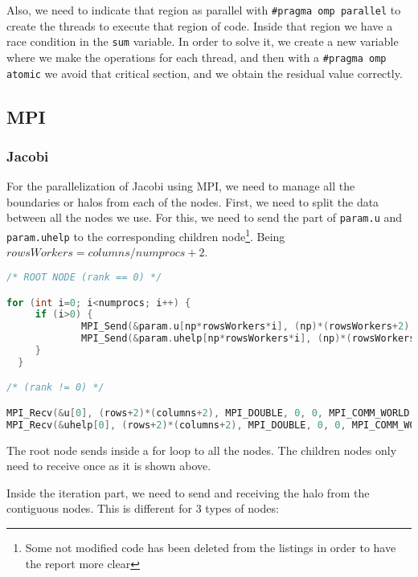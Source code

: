 \documentclass[a4paper, 10pt]{article}
\begin{document}
  Also, we need to indicate that region as parallel with \texttt{\#pragma omp parallel} to create the threads to execute that region of code. Inside that region we have a race condition in the \texttt{sum} variable. In order to solve it, we create a new variable where we make the operations for each thread, and then with a \texttt{\#pragma omp atomic} we avoid that critical section, and we obtain the residual value correctly.

\clearpage

\subsection{MPI}

\subsubsection{Jacobi}

For the parallelization of Jacobi using MPI, we need to manage all the boundaries or halos from each of the nodes. First, we need to split the data between all the nodes we use. For this, we need to send the part of \texttt{param.u} and \texttt{param.uhelp} to the corresponding children node\footnote{Some not modified code has been deleted from the listings in order to have the report more clear}. Being $rowsWorkers = columns / numprocs + 2$.

\begin{lstlisting}[language=c, caption={Sending/Receiving initial data to all nodes}]
/* ROOT NODE (rank == 0) */

for (int i=0; i<numprocs; i++) {
     if (i>0) {
             MPI_Send(&param.u[np*rowsWorkers*i], (np)*(rowsWorkers+2), MPI_DOUBLE, i, 0, MPI_COMM_WORLD);
             MPI_Send(&param.uhelp[np*rowsWorkers*i], (np)*(rowsWorkers+2), MPI_DOUBLE, i, 0, MPI_COMM_WORLD);
     }
  }    

/* (rank != 0) */

MPI_Recv(&u[0], (rows+2)*(columns+2), MPI_DOUBLE, 0, 0, MPI_COMM_WORLD, &status);
MPI_Recv(&uhelp[0], (rows+2)*(columns+2), MPI_DOUBLE, 0, 0, MPI_COMM_WORLD, &status);
\end{lstlisting}

The root node sends inside a for loop to all the nodes. The children nodes only need to receive once as it is shown above.


Inside the iteration part, we need to send and receiving the halo from the contiguous nodes. This is different for 3 types of nodes:
\end{document}
